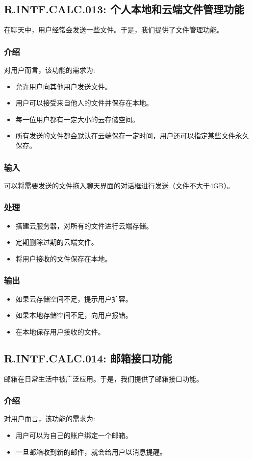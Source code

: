 \subsection{R.INTF.CALC.013: 个人本地和云端文件管理功能}
在聊天中，用户经常会发送一些文件。于是，我们提供了文件管理功能。
\subsubsection{介绍}
对用户而言，该功能的需求为:
\begin{itemize}
  \item 允许用户向其他用户发送文件。
  \item 用户可以接受来自他人的文件并保存在本地。
  \item 每一位用户都有一定大小的云存储空间。
  \item 所有发送的文件都会默认在云端保存一定时间，用户还可以指定某些文件永久保存。
\end{itemize}
\subsubsection{输入}
可以将需要发送的文件拖入聊天界面的对话框进行发送（文件不大于4GB）。
\subsubsection{处理}
\begin{itemize}
  \item 搭建云服务器，对所有的文件进行云端存储。
  \item 定期删除过期的云端文件。
  \item 将用户接收的文件保存在本地。
\end{itemize}
\subsubsection{输出}
\begin{itemize}
  \item 如果云存储空间不足，提示用户扩容。
  \item 如果本地存储空间不足，向用户报错。
  \item 在本地保存用户接收的文件。
\end{itemize}
\subsection{R.INTF.CALC.014: 邮箱接口功能}
邮箱在日常生活中被广泛应用。于是，我们提供了邮箱接口功能。
\subsubsection{介绍}
对用户而言，该功能的需求为:
\begin{itemize}
  \item 用户可以为自己的账户绑定一个邮箱。
  \item 一旦邮箱收到新的邮件，就会给用户以消息提醒。
\end{itemize}

